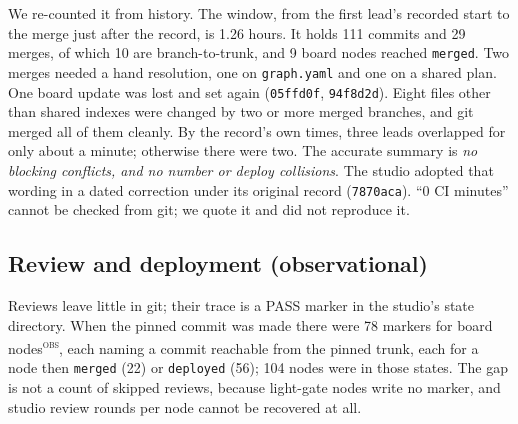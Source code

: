 \documentclass[11pt]{article}
\newcommand{\code}[1]{\texttt{#1}}
\newcommand{\obs}{\textsuperscript{\textsc{obs}}}
\begin{document}
We re-counted it from history. The window, from the first lead's recorded start to the %
merge just after the record, is 1.26 hours. It holds 111 commits and 29 merges, of which %
10 are branch-to-trunk, and 9 board nodes reached %
\code{merged}. Two merges needed a hand resolution, one on \code{graph.yaml} and one on a %
shared plan. One board update was lost and set again (\code{05ffd0f}, \code{94f8d2d}). %
Eight files other than shared indexes were changed by two or more merged branches, and %
git merged all of them cleanly. By the record's own times, three leads overlapped for %
only about a minute; otherwise there were two. The accurate summary is \emph{no blocking
conflicts, and no number or deploy collisions}. The studio adopted that wording in a %
dated correction under its original record (\code{7870aca}). ``0 CI minutes'' cannot be
checked from git; we quote it and did not reproduce it.

\subsection{Review and deployment (observational)}\label{sec:review-deploy}

Reviews leave little in git; their trace is a PASS marker in the studio's state
directory. When the pinned commit was made there were 78 markers for board nodes\obs{}, %
each naming a commit reachable from the pinned trunk, each for a node then \code{merged} %
(22) or \code{deployed} (56); 104 nodes were in those states. The gap is not a count of %
skipped reviews, because light-gate nodes write no marker, and studio review rounds per
node cannot be recovered at all.
\end{document}
